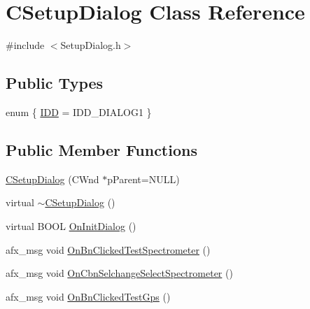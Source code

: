 \hypertarget{classCSetupDialog}{
\section{CSetupDialog Class Reference}
\label{classCSetupDialog}
}


{\ttfamily \#include $<$SetupDialog.h$>$}

\subsection*{Public Types}
\begin{DoxyCompactItemize}
\item 
enum \{ \hyperlink{classCSetupDialog_ace495d39f6e137af9aa38d8280538bc8a3b834c0eeebd3d78c306c35b991bcf2d}{IDD} =  IDD\_\-DIALOG1
 \}
\end{DoxyCompactItemize}
\subsection*{Public Member Functions}
\begin{DoxyCompactItemize}
\item 
\hyperlink{classCSetupDialog_ab8dcb94ea30d7976cc4ce7c860735c11}{CSetupDialog} (CWnd $\ast$pParent=NULL)
\item 
virtual \hyperlink{classCSetupDialog_aa0c13855f758753466953374e55b1f83}{$\sim$CSetupDialog} ()
\item 
virtual BOOL \hyperlink{classCSetupDialog_a04c93b2a69b09491c17ab0d7f01d0385}{OnInitDialog} ()
\item 
afx\_\-msg void \hyperlink{classCSetupDialog_a913713df904a301126dc536cc102a8bc}{OnBnClickedTestSpectrometer} ()
\item 
afx\_\-msg void \hyperlink{classCSetupDialog_aaf4a03bebfe2ee647b291c0584f4ddac}{OnCbnSelchangeSelectSpectrometer} ()
\item 
afx\_\-msg void \hyperlink{classCSetupDialog_acb6215e491e1c11a7cfeff4b64b78bfa}{OnBnClickedTestGps} ()
\end{DoxyCompactItemize}
